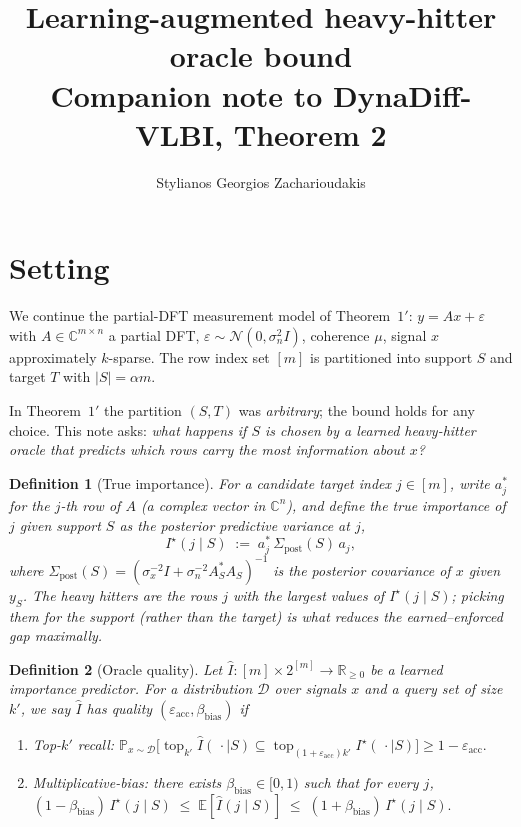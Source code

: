 \documentclass[11pt]{article}
\title{Learning-augmented heavy-hitter oracle bound \\
  \large Companion note to DynaDiff-VLBI, Theorem 2}
\author{Stylianos Georgios Zacharioudakis}
\date{}
\newtheorem{definition}{Definition}
\theoremstyle{remark}
\begin{document}
\maketitle

\section*{Setting}

We continue the partial-DFT measurement model of
Theorem~$1'$: $y = Ax + \varepsilon$ with $A\in\mathbb{C}^{m\times n}$
a partial DFT, $\varepsilon \sim \mathcal{N}(0,\sigma_n^2 I)$, coherence
$\mu$, signal $x$ approximately $k$-sparse. The row index set $[m]$ is
partitioned into support $S$ and target $T$ with $|S| = \alpha m$.

In Theorem~$1'$ the partition $(S,T)$ was \emph{arbitrary}; the bound
holds for any choice. This note asks: \textit{what happens if $S$ is
chosen by a \emph{learned heavy-hitter oracle} that predicts which rows
carry the most information about $x$?}

\begin{definition}[True importance]
For a candidate target index $j \in [m]$, write $a_j^{\!*}$ for the
$j$-th row of $A$ (a complex vector in $\mathbb{C}^n$), and define the
\emph{true importance} of $j$ given support $S$ as the posterior
predictive variance at $j$,
\begin{equation}
    I^\star(j \mid S) \;:=\; a_j^{\!*}\, \Sigma_{\mathrm{post}}(S)\, a_j,
\end{equation}
where $\Sigma_{\mathrm{post}}(S) = (\sigma_x^{-2} I + \sigma_n^{-2}
A_S^{\!*} A_S)^{-1}$ is the posterior covariance of $x$ given $y_S$. The
heavy hitters are the rows $j$ with the largest values of
$I^\star(j \mid S)$; picking them for the \emph{support} (rather than
the target) is what reduces the earned--enforced gap maximally.
\end{definition}

\begin{definition}[Oracle quality]\label{def:oracle-quality}
Let $\hat{I}:[m]\times 2^{[m]}\to\mathbb{R}_{\geq 0}$ be a learned
importance predictor. For a distribution $\mathcal{D}$ over signals $x$
and a query set of size $k'$, we say $\hat{I}$ has quality
$(\varepsilon_{\mathrm{acc}}, \beta_{\mathrm{bias}})$ if
\begin{enumerate}
    \item[(Acc)] \emph{Top-$k'$ recall:}
    $\displaystyle
    \mathbb{P}_{x\sim\mathcal{D}}\!\Big[
        \operatorname{top}_{k'}\!\hat{I}(\,\cdot\mid S)
        \subseteq
        \operatorname{top}_{(1+\varepsilon_{\mathrm{acc}})k'}\!I^\star(\,\cdot\mid S)
    \Big] \geq 1-\varepsilon_{\mathrm{acc}}.$
    \item[(Bias)] \emph{Multiplicative-bias:} there exists
    $\beta_{\mathrm{bias}} \in [0,1)$ such that for every $j$,
    $(1-\beta_{\mathrm{bias}})\,I^\star(j\mid S) \;\leq\; \mathbb{E}[\hat{I}(j\mid S)] \;\leq\; (1+\beta_{\mathrm{bias}})\,I^\star(j\mid S).$
\end{enumerate}
\end{definition}
\end{document}
